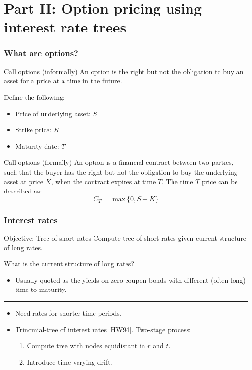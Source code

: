 \section{Part II: Option pricing using interest rate trees}

\newcommand{\tabitem}{~~\llap{\textbullet}~~}


\begin{frame}
\frametitle{What are options?}
%
%
\begin{block}{Call options (informally)}
An option is the right but not the obligation to buy an
asset for a price at a time in the future.
\end{block}
%
Define the following:
%
\begin{itemize}
  \item Price of underlying asset: $S$
  \item Strike price: $K$
  \item Maturity date: $T$
\end{itemize}
%
%
\begin{block}{Call options (formally)}
An option is a financial contract between two parties, such
that the buyer has the right but not the obligation to buy
the underlying asset at price $K$, when the contract expires
at time $T$. The time $T$ price can be described as:
\begin{equation}
  C_T = \operatorname{max} \{ 0, S - K \}
\end{equation}
\end{block}
\end{frame}


\begin{frame}
  \frametitle{Interest rates}
%
  \begin{block}{Objective: Tree of short rates}
    Compute tree of short rates given current structure of
    long rates.
  \end{block}

What is the current structure of long rates?
\begin{itemize}
\item Usually quoted as the yields on zero-coupon bonds with
  different (often long) time to maturity.
\end{itemize}
%
\vspace{0.25cm}
\hrule
\vspace{0.25cm}
%
\begin{itemize}
\item Need rates for shorter time periods.
\item Trinomial-tree of interest rates [HW94]. Two-stage
  process:
\begin{enumerate}
  \item Compute tree with nodes equidistant in $r$ and $t$.
  \item Introduce time-varying drift.
\end{enumerate}
%
\end{itemize}
\end{frame}

